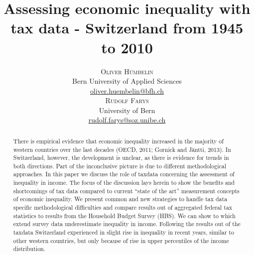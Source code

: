\documentclass[twoside]{article}\usepackage[]{graphicx}\usepackage[]{color}
\title{\vspace{-15mm}\fontsize{24pt}{10pt}\selectfont\textbf{Assessing economic inequality with tax data - Switzerland from 1945 to 2010}} %
\author{
\large
\textsc{Oliver Hümbelin}\\[2mm] %
\normalsize Bern University of Applied Sciences \\ %
\normalsize \href{mailto:oliver.huembelin@bfh.ch}{oliver.huembelin@bfh.ch} %
\vspace{5mm}\\
\large
\textsc{Rudolf Farys}\\[2mm] %
\normalsize University of Bern \\ %
\normalsize \href{mailto:rudolf.farys@soz.unibe.ch}{rudolf.farys@soz.unibe.ch} %
\vspace{-5mm}
}
\date{}
\begin{document}
\maketitle 

\thispagestyle{fancy} %





\begin{abstract}
There is empirical evidence that economic inequality increased in the majority of western countries over the last decades (OECD, 2011; Gornick and Jäntti, 2013). 
In Switzerland, however, the development is unclear, as there is evidence for trends in both directions. Part of the inconclusive picture is due to different methodological approaches. In this paper we discuss the role of taxdata concerning the assessment of inequality in income. 
The focus of the discussion lays herein to show the benefits and shortcomings of tax data compared to current ``state of the art'' measurement concepts of economic inequality. 
We present common and new strategies to handle tax data specific methodological difficulties and compare results out of aggregated federal tax statistics to results from the Household Budget Survey (HBS). 
We can show to which extend survey data underestimate inequality in income. 
Following the results out of the taxdata Switzerland experienced in slight rise in inequality in recent years, similar to other western countries, but only because of rise in upper percentiles of the income distribution.




\end{abstract}


\end{document}
